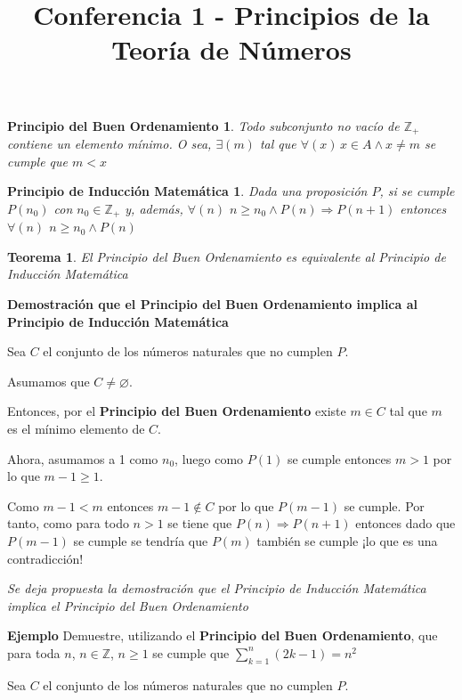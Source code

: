 \documentclass[a4paper,1pt]{report}
\title{Conferencia 1 - Principios de la Teoría de Números}
\author{}
\newtheorem*{pbo}{Principio del Buen Ordenamiento}
\newtheorem*{pim}{Principio de Inducción Matemática}
\newtheorem*{teo}{Teorema}
\begin{document}
\maketitle


\begin{pbo}

Todo subconjunto no vacío de $\mathbb{Z}_{+}$ contiene un elemento mínimo. O sea,
$\exists(m)$ tal que $\forall(x)\, x\in A\wedge x\neq m$ se cumple que $m<x$
\end{pbo}

\begin{pim}
 Dada una proposición $P$, si se cumple $P(n_0)$ con $n_0\in \mathbb{Z}_{+}$ y, además, 
 $\forall(n)$ $n\geq n_0\wedge P(n) \Rightarrow P(n+1)$ entonces $\forall(n)$ $n\geq n_0 \wedge P(n)$
\end{pim}

\begin{teo}
 El Principio del Buen Ordenamiento es equivalente al Principio de Inducción Matemática
\end{teo}

\textbf{Demostración que  el Principio del Buen Ordenamiento implica al Principio de Inducción Matemática}

Sea $C$ el conjunto de los números naturales que no cumplen $P$. 

Asumamos que $C\neq \varnothing$. 

Entonces, por el \textbf{Principio del Buen Ordenamiento} existe $m\in C$ tal que $m$ es el mínimo elemento de $C$.

Ahora, asumamos a 1 como $n_0$, luego como $P(1)$ se cumple entonces $m>1$ por lo que $m-1\geq 1$.

Como $m-1<m$ entonces $m-1\notin C$ por lo que $P(m-1)$ se cumple. Por tanto, como para todo $n>1$ se tiene que $P(n)\Rightarrow P(n+1)$ entonces dado que $P(m-1)$ se cumple se tendría que $P(m)$ también se cumple ¡lo que es una contradicción!

\textit{Se deja propuesta la demostración que el Principio de Inducción Matemática implica el Principio del Buen Ordenamiento}

\textbf{Ejemplo}
Demuestre, utilizando el \textbf{Principio del Buen Ordenamiento}, que para toda $n$, $n\in\mathbb{Z}$, $n\geq 1$ se cumple que $\sum^n_{k=1}(2k-1)=n^2$

Sea $C$ el conjunto de los números naturales que no cumplen $P$. 
\end{document}

